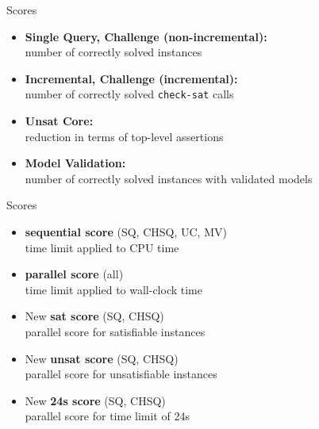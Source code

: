 \documentclass[10pt]{beamer}
\newcommand{\orange}[1]{\textcolor{mLightBrown}{#1}}
\newcommand{\akey}[1]{\texttt{#1}\xspace}
\begin{document}
  \begin{frame}{Scores}
    \begin{itemize}
      \item \textbf{Single Query, Challenge (non-incremental):}\\
        number of correctly solved instances
      \vspace{1ex}
      \item \textbf{Incremental, Challenge (incremental):}\\
        number of correctly solved \akey{check-sat} calls
      \vspace{1ex}
      \item \textbf{Unsat Core:}\\
        reduction in terms of top-level assertions
      \vspace{1ex}
      \item \textbf{Model Validation:}\\
        number of correctly solved instances with validated models
    \end{itemize}
  \end{frame}

  \begin{frame}{Scores}
    \begin{itemize}
      \item \textbf{sequential score} (SQ, CHSQ, UC, MV)\\
        time limit applied to CPU time
      \vspace{1ex}
      \item \textbf{parallel score} (all)\\
        time limit applied to wall-clock time
      \vspace{1ex}
      \item \orange{New} \textbf{sat score} (SQ, CHSQ)\\
        parallel score for satisfiable instances
      \vspace{1ex}
      \item \orange{New} \textbf{unsat score} (SQ, CHSQ)\\
        parallel score for unsatisfiable instances
      \vspace{1ex}
      \item \orange{New} \textbf{24s score} (SQ, CHSQ)\\
        parallel score for time limit of 24s
    \end{itemize}
  \end{frame}
\end{document}
